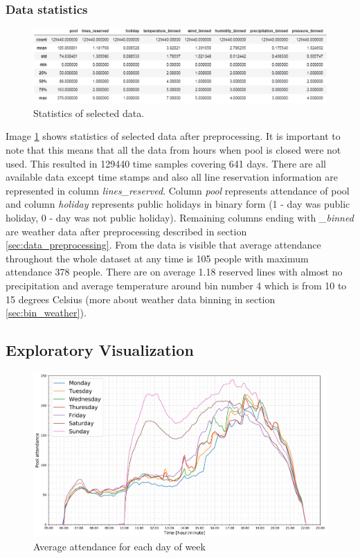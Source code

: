 \documentclass{article}
\begin{document}
\subsubsection{Data statistics}
\begin{figure}[h!]
\centering
\includegraphics[width=16cm]{imgs/stats.png}
\caption{Statistics of selected data.}
\label{fig:features_stats}
\end{figure}

Image \ref{fig:features_stats} shows statistics of selected data after preprocessing. It is important to note that this means that all the data from hours when pool is closed were not used. This resulted in 129440 time samples covering 641 days. There are all available data except time stamps and also all line reservation information are represented in column \emph{lines\_reserved}. Column \emph{pool} represents attendance of pool and column \emph{holiday} represents public holidays in binary form (1 - day was public holiday, 0 - day was not public holiday). Remaining columns ending with \emph{\_binned} are weather data after preprocessing described in section \ref{sec:data_preprocessing}. From the data is visible that average attendance throughout the whole dataset at any time is 105 people with maximum attendance 378 people. There are on average 1.18 reserved lines with almost no precipitation and average temperature around bin number 4 which is from 10 to 15 degrees Celsius (more about weather data binning in section \ref{sec:bin_weather}).

\subsection{Exploratory Visualization}
\begin{figure}[h!]
\centering
\includegraphics[width=13cm]{imgs/averages}
\caption{Average attendance for each day of week}
\label{fig:averages}
\end{figure}
\end{document}
